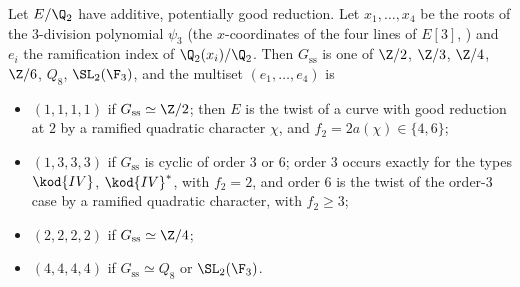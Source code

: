 \begin{proposition}\label{prop:reduction:inertia-at-2}
Let $E/\Q_2$ have additive, potentially good reduction. Let $x_1,\dots,x_4$ be the roots of the $3$-division polynomial $\psi_3$ (the
$x$-coordinates of the four lines of $E[3]$, ) and $e_i$ the ramification index of $\Q_2(x_i)/\Q_2$. Then
$G_{\mathrm{ss}}$ is one of $\Z/2$, $\Z/3$, $\Z/4$, $\Z/6$, $Q_8$, $\SL_2(\F_3)$, and the multiset $(e_1,\dots,e_4)$ is
\begin{itemize}
\item $(1,1,1,1)$ if $G_{\mathrm{ss}}\simeq\Z/2$; then $E$ is the twist of a curve with good reduction at $2$ by a ramified quadratic
character $\chi$, and $f_2=2a(\chi)\in\{4,6\}$;
\item $(1,3,3,3)$ if $G_{\mathrm{ss}}$ is cyclic of order $3$ or $6$; order $3$ occurs exactly for the types $\kod{IV}$, $\kod{IV}^*$, with
$f_2=2$, and order $6$ is the twist of the order-$3$ case by a ramified quadratic character, with $f_2\ge3$;
\item $(2,2,2,2)$ if $G_{\mathrm{ss}}\simeq\Z/4$;
\item $(4,4,4,4)$ if $G_{\mathrm{ss}}\simeq Q_8$ or $\SL_2(\F_3)$.
\end{itemize}
\end{proposition}

